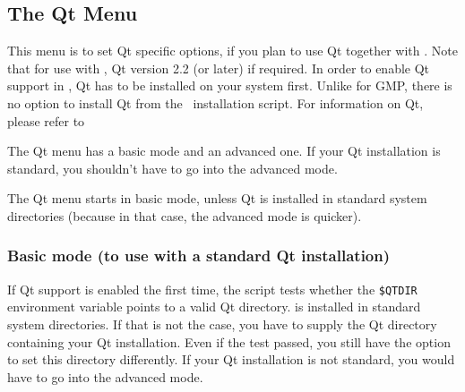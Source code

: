 \subsection{The Qt Menu}\label{sec:qt-menu}

This menu is to set Qt specific options, if you plan to use Qt
together with \cgal . Note that for use with \cgal, Qt version 2.2 (or
later) if required. In order to enable Qt support in \cgal, Qt has to
be installed on your system first.
Unlike for GMP, there is no option to install Qt from the \cgal\ 
installation script.  For information on Qt, please refer to
\begin{quote}
  \qtpage
\end{quote}

\begin{ccAdvanced}
The Qt menu has a basic mode and an advanced one. If your Qt
installation is standard, you shouldn't have to go into the advanced
mode.

The Qt menu starts in basic mode, unless Qt is installed in standard
system directories (because in that case, the advanced mode is quicker).
\end{ccAdvanced}

\subsubsection{Basic mode (to use with a standard Qt installation)}

If Qt support is enabled the first time, the script tests whether the
\texttt{\$QTDIR} environment variable points to a valid Qt directory.
is installed in standard system directories. If that is not the case,
you have to supply the Qt directory containing your Qt
installation. Even if the test passed, you still have the option to
set this directory differently.
If your Qt installation is not standard, you would have to go into the
advanced mode.\bigskip



